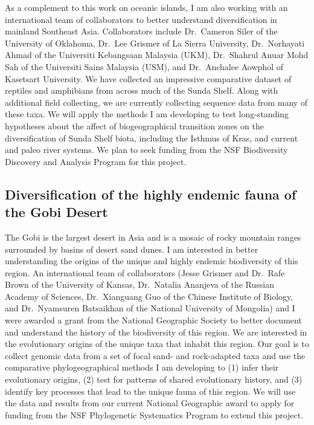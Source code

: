 As a complement to this work on oceanic islands, I am also working with an
international team of collaborators to better understand diversification in
mainland Southeast Asia.
Collaborators include
Dr.\ Cameron Siler of the University of Oklahoma,
Dr.\ Lee Grismer of La Sierra University,
Dr.\ Norhayati Ahmad of the Universiti
Kebangsaan Malaysia (UKM),
Dr.\ Shahrul Anuar Mohd Sah of the Universiti Sains Malaysia (USM),
and
Dr.\ Anchalee Aowphol of Kasetsart University.
We have collected an impressive comparative dataset of reptiles and amphibians
from across much of the Sunda Shelf.
Along with additional field collecting, we are currently collecting sequence
data from many of these taxa.
We will apply the methods I am developing to test long-standing hypotheses
about the affect of biogeographical transition zones on the diversification of
Sunda Shelf biota, including the Isthmus of Kras, and current and paleo river
systems.
We plan to seek funding from the NSF Biodiversity Discovery and Analysis
Program for this project.

\subsection*{Diversification of the highly endemic fauna of the Gobi Desert}
The Gobi is the largest desert in Asia and is a mosaic of rocky mountain ranges
surrounded by basins of desert sand dunes.
I am interested in better understanding the origins of the unique and highly
endemic biodiversity of this region.
An international team of collaborators
(Jesse Grismer and Dr.\ Rafe Brown of the University of Kansas,
Dr.\ Natalia Ananjeva of the Russian Academy of Sciences,
Dr.\ Xianguang Guo of the Chinese Institute of Biology, and
Dr.\ Nyamsuren Batsaikhan of the National University of Mongolia)
and I were awarded a grant from the National Geographic Society to better
document and understand the history of the biodiversity of this region.
We are interested in the evolutionary origins of the unique taxa that
inhabit this region.
Our goal is to collect genomic data from a set of focal sand- and rock-adapted
taxa and use the comparative phylogeographical methods I am developing to
(1) infer their evolutionary origins,
(2) test for patterns of shared evolutionary history, and
(3) identify key processes that lead to the unique fauna of this region.
We will use the data and results from our current National Geographic award to
apply for funding from the NSF Phylogenetic Systematics Program to extend this
project.

